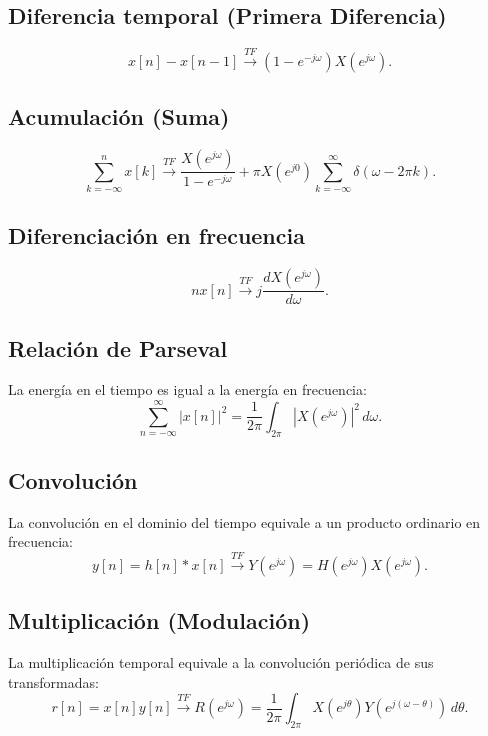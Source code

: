 \documentclass[11pt,a4paper,openany]{book}
\begin{document}
\subsection{Diferencia temporal (Primera Diferencia)}
\begin{equation}
	x[n] - x[n-1] \xrightarrow{TF} (1 - e^{-j\omega}) X(e^{j\omega}).
\end{equation}

\subsection{Acumulaci\'{o}n (Suma)}
\begin{equation}
	\sum_{k=-\infty}^{n} x[k] \xrightarrow{TF} \frac{X(e^{j\omega})}{1 - e^{-j\omega}} + \pi X(e^{j0}) \sum_{k=-\infty}^{\infty} \delta(\omega - 2\pi k).
\end{equation}

\subsection{Diferenciaci\'{o}n en frecuencia}
\begin{equation}
	n x[n] \xrightarrow{TF} j \frac{d X(e^{j\omega})}{d\omega}.
\end{equation}

\subsection{Relaci\'{o}n de Parseval}
La energía en el tiempo es igual a la energía en frecuencia:
\begin{equation}
	\sum_{n=-\infty}^{\infty} |x[n]|^{2} = \frac{1}{2\pi} \int_{2\pi} |X(e^{j\omega})|^{2} \, d\omega.
\end{equation}

\subsection{Convoluci\'{o}n}
La convolución en el dominio del tiempo equivale a un producto ordinario en frecuencia:
\begin{equation}
	y[n] = h[n] * x[n] \xrightarrow{TF} Y(e^{j\omega}) = H(e^{j\omega}) X(e^{j\omega}).
\end{equation}

\subsection{Multiplicaci\'{o}n (Modulación)}
La multiplicación temporal equivale a la convolución periódica de sus transformadas:
\begin{equation}
	r[n] = x[n] y[n] \xrightarrow{TF} R(e^{j\omega}) = \frac{1}{2\pi} \int_{2\pi} X(e^{j\theta}) Y(e^{j(\omega - \theta)}) \, d\theta.
\end{equation}
\end{document}
